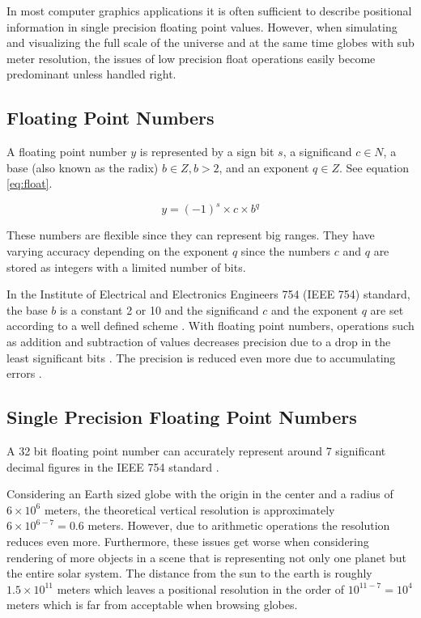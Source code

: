 In most computer graphics applications it is often sufficient to describe positional information in single precision floating point values. However, when simulating and visualizing the full scale of the universe and at the same time globes with sub meter resolution, the issues of low precision float operations easily become predominant unless handled right.

\subsection{Floating Point Numbers}
A floating point number $y$ is represented by a sign bit $s$, a significand $c \in N$, a base (also known as the radix) $b \in Z, b > 2$, and an exponent $q \in Z$. See equation \ref{eq:float}.

\begin{equation}
\label{eq:float}
y=(-1)^s \times c \times b^q
\end{equation}

These numbers are flexible since they can represent big ranges. They have varying accuracy depending on the exponent $q$ since the numbers $c$ and $q$ are stored as integers with a limited number of bits.

In the Institute of Electrical and Electronics Engineers 754 (IEEE 754) standard, the base $b$ is a constant 2 or 10 and the significand $c$ and the exponent $q$ are set according to a well defined scheme \cite{ieee754}. With floating point numbers, operations such as addition and subtraction of values decreases precision due to a drop in the least significant bits \cite{cozzi11}. The precision is reduced even more due to accumulating errors \cite{cozzi11}.

\subsection{Single Precision Floating Point Numbers}

A 32 bit floating point number can accurately represent around 7 significant decimal figures in the IEEE 754 standard \cite{cozzi11}.

Considering an Earth sized globe with the origin in the center and a radius of $6 \times 10^6$ meters, the theoretical vertical resolution is approximately $6 \times 10^{6-7} = 0.6$ meters. However, due to arithmetic operations the resolution reduces even more. Furthermore,  these issues get worse when considering rendering of more objects in a scene that is representing not only one planet but the entire solar system. The distance from the sun to the earth is roughly $1.5 \times 10^{11}$ meters which leaves a positional resolution in the order of $10^{11 - 7} = 10^4$ meters which is far from acceptable when browsing globes.

